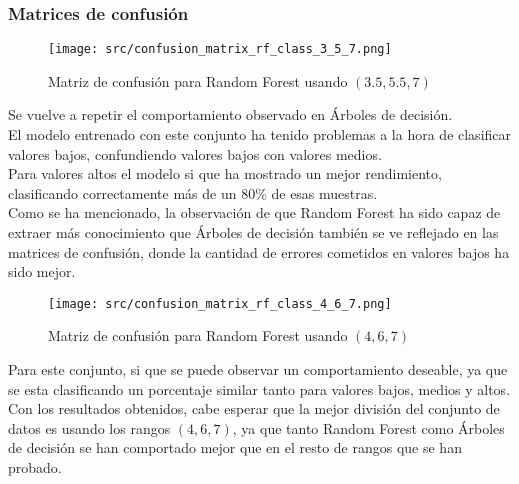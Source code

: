 \subsubsection*{Matrices de confusión}
\begin{figure}[H]
	\centering
	\texttt{[image: src/confusion\_matrix\_rf\_class\_3\_5\_7.png]}
	\caption{Matriz de confusión para Random Forest usando $(3.5,5.5,7)$}
	\label{fig:confusion_matrix_rf1}
\end{figure}
Se vuelve a repetir el comportamiento observado en Árboles de decisión. \\
El modelo entrenado con este conjunto ha tenido problemas a la hora de clasificar valores bajos, confundiendo valores bajos con valores medios.\\
Para valores altos el modelo si que ha mostrado un mejor rendimiento, clasificando correctamente más de un 80\% de esas muestras. \\
\linebreak
Como se ha mencionado, la observación de que Random Forest ha sido capaz de extraer más conocimiento que Árboles de decisión también se ve reflejado en las matrices de confusión, donde la cantidad de errores cometidos en valores bajos ha sido mejor.
\begin{figure}[H]
	\centering
	\texttt{[image: src/confusion\_matrix\_rf\_class\_4\_6\_7.png]}
	\caption{Matriz de confusión para Random Forest usando $(4,6,7)$}
	\label{fig:confusion_matrix_rf2}
\end{figure}
Para este conjunto, si que se puede observar un comportamiento deseable, ya que se esta clasificando un porcentaje similar tanto para valores bajos, medios y altos.\\
\linebreak
Con los resultados obtenidos, cabe esperar que la mejor división del conjunto de datos es usando los rangos $(4,6,7)$, ya que tanto Random Forest como Árboles de decisión se han comportado mejor que en el resto de rangos que se han probado.
\clearpage
